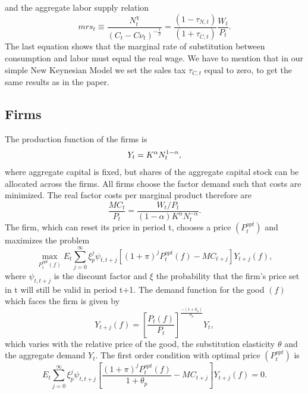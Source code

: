 \documentclass[12pt,a4paper,oneside,titlepage]{article}
\begin{document}
and the aggregate labor supply relation
\begin{equation}
mrs_t \equiv \frac{N_t^\chi}{\left(C_t - C\nu_t\right)^{-\frac{1}{\sigma}}} = \frac{\left(1 - \tau_{N,t}\right)}{\left(1 + \tau_{C,t}\right)} \frac{W_t}{P_t}.
\end{equation}
The last equation shows that the marginal rate of substitution between consumption and labor must equal the real wage.
We have to mention that in our simple New Keynesian Model we set the sales tax $\tau_{C,t}$ equal to zero, to get the same results as in the paper.

\subsection*{Firms}
The production function of the firms is
\begin{equation}
Y_t = K^\alpha N_t^{1-\alpha},\vspace{-0.3cm} \nonumber
\end{equation}
where aggregate capital is fixed, but shares of the aggregate capital stock can be allocated across the firms. All firms choose the factor demand such that costs are minimized. The real factor costs per marginal product therefore are
\begin{equation}
\frac{MC_t}{P_t} = \frac{W_t/P_t}{\left(1 - \alpha \right) K^\alpha N_t^{-\alpha}}.
\end{equation}
The firm, which can reset its price in period t, chooses a price $\left(P_t^{opt} \right)$ and maximizes the problem
\begin{equation}
\max_{P_t^{opt}\left(f\right)} E_t \sum_{j=0}^\infty \xi_p^j \psi_{t,t+j} \left[ \left(1 + \pi \right)^j P_t^{opt}\left(f\right) - MC_{t+j} \right] Y_{t+j} \left(f\right),\nonumber
\end{equation}
where $\psi_{t,t+j}$ is the discount factor and $\xi$ the probability that the firm's price set in t will still be valid in period t+1. The demand function for the good $\left(f\right)$ which faces the firm is given by
\begin{equation}
Y_{t+j}\left(f\right) = \left[\frac{P_t \left(f\right)}{P_t} \right]^{\frac{-\left(1+\theta_p\right)}{\theta_p}} Y_t \nonumber,
\end{equation}
which varies with the relative price of the good, the substitution elasticity $\theta$ and the aggregate demand $Y_t$. The first order condition with optimal price $\left(P_t^{opt} \right)$ is
\begin{equation}
E_t \sum_{j=0}^\infty \xi_p^j \psi_{t,t+j} \left[ \frac{\left(1 + \pi \right)^j P_t^{opt}\left(f\right)}{1 + \theta_p} - MC_{t+j} \right] Y_{t+j}\left(f\right) = 0.
\end{equation}
\end{document}
